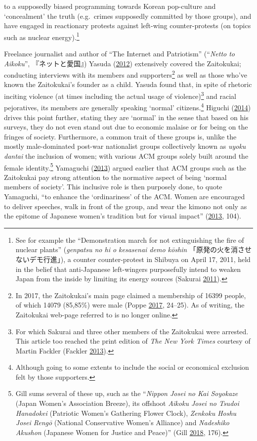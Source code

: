 \documentclass[10pt,british,A4paper,,openany]{memoir}
\begin{document}
to a supposedly biased programming towards Korean pop-culture and
`concealment' the truth (e.g.~crimes supposedly committed by those
groups), and have engaged in reactionary protests against left-wing
counter-protests (on topics such as nuclear energy).\footnote{See for
  example the ``Demonstration march for not extinguishing the fire of
  nuclear plants'' (\emph{genpatsu no hi o kesasenai demo kōshin}
  「原発の火を消させないデモ行進」), a counter counter-protest in
  Shibuya on April 17, 2011, held in the belief that anti-Japanese
  left-wingers purposefully intend to weaken Japan from the inside by
  limiting its energy sources (Sakurai
  \protect\hyperlink{ref-sakurai__2011}{2011}).}

Freelance journalist and author of ``The Internet and Patriotism''
(``\emph{Netto to Aikoku}'', 『ネットと愛国』) Yasuda
(\protect\hyperlink{ref-yasuda_eng:_2012}{2012}) extensively covered the
Zaitokukai; conducting interviews with its members and
supporters\footnote{In 2017, the Zaitokukai's main page claimed a
  membership of 16399 people, of which 14079 (85,85\%) were male (Poppe
  \protect\hyperlink{ref-poppe_digitaal_2017}{2017}, 24--25). As of
  writing, the Zaitokukai web-page referred to is no longer online.} as
well as those who've known the Zaitokukai's founder as a child. Yasuda
found that, in spite of rhetoric inciting violence (at times including
the actual usage of violence)\footnote{For which Sakurai and three other
  members of the Zaitokukai were arrested. This article too reached the
  print edition of \emph{The New York Times} courtesy of Martin Fackler
  (Fackler \protect\hyperlink{ref-fackler_japanese_2013}{2013}).} and
racial pejoratives, its members are generally speaking `normal'
citizens.\footnote{Although going to some extents to include the social
  or economical exclusion felt by those supporters.} Higuchi
(\protect\hyperlink{ref-higuchi_japans_2014}{2014}) drives this point
further, stating they are `normal' in the sense that based on his
surveys, they do not even stand out due to economic malaise or for being
on the fringes of society. Furthermore, a common trait of these groups
is, unlike the mostly male-dominated post-war nationalist groups
collectively known as \emph{uyoku dantai} the inclusion of women; with
various ACM groups solely built around the female identity.\footnote{Gill
  sums several of these up, such as the ``\emph{Nippon Josei no Kai
  Soyokaze} (Japan Women's Association Breeze), its offshoot
  \emph{Aikoku Josei no Tsudoi Hanadokei} (Patriotic Women's Gathering
  Flower Clock), \emph{Zenkoku Hoshu Josei Rengō} (National Conservative
  Women's Alliance) and \emph{Nadeshiko Akushon} (Japanese Women for
  Justice and Peace)'' (Gill
  \protect\hyperlink{ref-gill_nativist_2018}{2018}, 176).} Yamaguchi
(\protect\hyperlink{ref-yamaguchi_xenophobia_2013}{2013}) argued earlier
that ACM groups such as the Zaitokukai pay strong attention to the
normative aspect of being `normal members of society'. This inclusive
role is then purposely done, to quote Yamaguchi, ``to enhance the
`ordinariness' of the ACM. Women are encouraged to deliver speeches,
walk in front of the group, and wear the kimono not only as the epitome
of Japanese women's tradition but for visual impact''
(\protect\hyperlink{ref-yamaguchi_xenophobia_2013}{2013}, 104).
\end{document}
